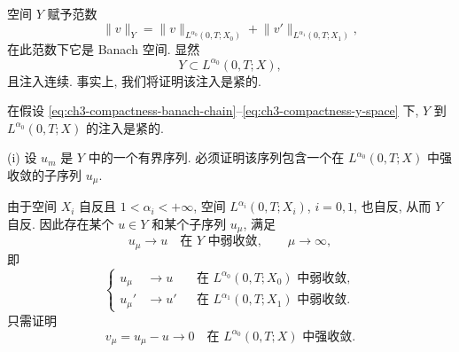 \hypertarget{chapter-03-page-199}{}
空间 $Y$ 赋予范数
\begin{equation}
\lVert v\rVert_Y=\lVert v\rVert_{L^{\alpha_0}(0,T;X_0)}
+\lVert v'\rVert_{L^{\alpha_1}(0,T;X_1)},
\label{eq:ch3-compactness-y-norm}
\end{equation}
在此范数下它是 Banach 空间. 显然
\[
Y\subset L^{\alpha_0}(0,T;X),
\]
且注入连续. 事实上, 我们将证明该注入是紧的.

\begin{Theorem}
\label{thm:ch3-compactness-aubin-lions-banach}
在假设 \eqref{eq:ch3-compactness-banach-chain}--\eqref{eq:ch3-compactness-y-space} 下, $Y$ 到 $L^{\alpha_0}(0,T;X)$ 的注入是紧的.
\end{Theorem}

\begin{Proof}
(i) 设 $u_m$ 是 $Y$ 中的一个有界序列. 必须证明该序列包含一个在 $L^{\alpha_0}(0,T;X)$ 中强收敛的子序列 $u_\mu$.

由于空间 $X_i$ 自反且 $1<\alpha_i<+\infty$, 空间 $L^{\alpha_i}(0,T;X_i)$, $i=0,1$, 也自反, 从而 $Y$ 自反. 因此存在某个 $u\in Y$ 和某个子序列 $u_\mu$, 满足
\begin{equation}
u_\mu\longrightarrow u\quad\text{在 }Y\text{ 中弱收敛},
\qquad\mu\to\infty,
\label{eq:ch3-compactness-y-weak-convergence}
\end{equation}
即
\begin{equation}
\left\{
\begin{aligned}
u_\mu&\longrightarrow u&&\text{在 }L^{\alpha_0}(0,T;X_0)\text{ 中弱收敛},\\
u_\mu'&\longrightarrow u'&&\text{在 }L^{\alpha_1}(0,T;X_1)\text{ 中弱收敛}.
\end{aligned}
\right.
\label{eq:ch3-compactness-component-weak-convergence}
\end{equation}
只需证明
\begin{equation}
v_\mu=u_\mu-u\longrightarrow0
\quad\text{在 }L^{\alpha_0}(0,T;X)\text{ 中强收敛}.
\label{eq:ch3-compactness-banach-strong-goal}
\end{equation}


\end{Proof}
